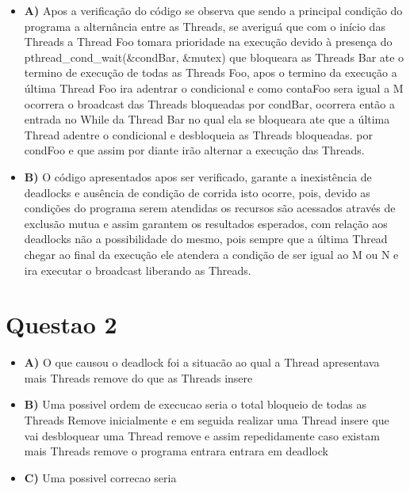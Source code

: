 \documentclass{article}
\begin{document}
\begin{itemize}
\item
  \textbf{A)} Apos a verificação do código se observa que sendo a
  principal condição do programa a alternância entre as Threads, se
  averiguá que com o início das Threads a Thread Foo tomara prioridade
  na execução devido à presença do pthread\_cond\_wait(\&condBar,
  \&mutex) que bloqueara as Threads Bar ate o termino de execução de
  todas as Threads Foo, apos o termino da execução a última Thread Foo
  ira adentrar o condicional e como contaFoo sera igual a M ocorrera o
  broadcast das Threads bloqueadas por condBar, ocorrera então a entrada
  no While da Thread Bar no qual ela se bloqueara ate que a última
  Thread adentre o condicional e desbloqueia as Threads bloqueadas. por
  condFoo e que assim por diante irão alternar a execução das Threads.
\item
  \textbf{B)} O código apresentados apos ser verificado, garante a
  inexistência de deadlocks e ausência de condição de corrida isto
  ocorre, pois, devido as condições do programa serem atendidas os
  recursos são acessados através de exclusão mutua e assim garantem os
  resultados esperados, com relação aos deadlocks não a possibilidade do
  mesmo, pois sempre que a última Thread chegar ao final da execução ele
  atendera a condição de ser igual ao M ou N e ira executar o broadcast
  liberando as Threads.
\end{itemize}

\section{Questao 2}\label{questao-2}

\begin{itemize}
\item
  \textbf{A)} O que causou o deadlock foi a situacão ao qual a Thread
  apresentava mais Threads remove do que as Threads insere
\item
  \textbf{B)} Uma possivel ordem de execucao seria o total bloqueio de
  todas as Threads Remove inicialmente e em seguida realizar uma Thread
  insere que vai desbloquear uma Thread remove e assim repedidamente
  caso existam mais Threads remove o programa entrara entrara em
  deadlock
\item
  \textbf{C)} Uma possivel correcao seria
\end{itemize}
\end{document}
